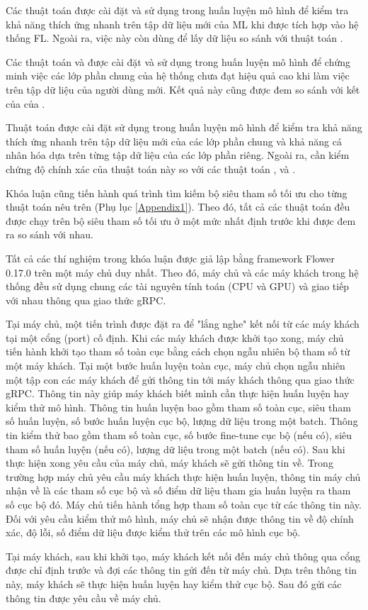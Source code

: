 Các thuật toán  được cài đặt và sử dụng trong huấn luyện mô hình để kiểm tra khả năng thích ứng nhanh trên tập dữ liệu mới của ML khi được tích hợp vào hệ thống FL. Ngoài ra, việc này còn dùng để lấy dữ liệu so sánh với thuật toán .

Các thuật toán  và  được cài đặt và sử dụng trong huấn luyện mô hình để chứng minh việc các lớp phần chung của hệ thống chưa đạt hiệu quả cao khi làm việc trên tập dữ liệu của người dùng mới. Kết quả này cũng được đem so sánh với kết của của .

Thuật toán  được cài đặt sử dụng trong huấn luyện mô hình để kiểm tra khả năng thích ứng nhanh trên tập dữ liệu mới của các lớp phần chung và khả năng cá nhân hóa dựa trên từng tập dữ liệu của các lớp phần riêng. Ngoài ra, cần kiểm chứng độ chính xác của thuật toán này so với các thuật toán ,  và .

Khóa luận cũng tiến hành quá trình tìm kiếm bộ siêu tham số tối ưu cho từng thuật toán nêu trên (Phụ lục \ref{Appendix1}). Theo đó, tất cả các thuật toán đều được chạy trên bộ siêu tham số tối ưu ở một mức nhất định trước khi được đem ra so sánh với nhau.

Tất cả các thí nghiệm trong khóa luận được giả lập bằng framework Flower 0.17.0 \cite{beutel2020flower} trên một máy chủ duy nhất. Theo đó, máy chủ và các máy khách trong hệ thống đều sử dụng chung các tài nguyên tính toán (CPU và GPU) và giao tiếp với nhau thông qua giao thức gRPC.

Tại máy chủ, một tiến trình được đặt ra để "lắng nghe" kết nối từ các máy khách tại một cổng (port) cố định. Khi các máy khách được khởi tạo xong, máy chủ tiến hành khởi tạo tham số toàn cục bằng cách chọn ngẫu nhiên bộ tham số từ một máy khách. Tại một bước huấn luyện toàn cục, máy chủ chọn ngẫu nhiên một tập con các máy khách để gửi thông tin tới máy khách thông qua giao thức gRPC. Thông tin này giúp máy khách biết mình cần thực hiện huấn luyện hay kiểm thử mô hình. Thông tin huấn luyện bao gồm tham số toàn cục, siêu tham số huấn luyện, số bước huấn luyện cục bộ, lượng dữ liệu trong một batch. Thông tin kiểm thử bao gồm tham số toàn cục, số bước fine-tune cục bộ (nếu có), siêu tham số huấn luyện (nếu có), lượng dữ liệu trong một batch (nếu có). Sau khi thực hiện xong yêu cầu của máy chủ, máy khách sẽ gửi thông tin về. Trong trường hợp máy chủ yêu cầu máy khách thực hiện huấn luyện, thông tin máy chủ nhận về là các tham số cục bộ và số điểm dữ liệu tham gia huấn luyện ra tham số cục bộ đó. Máy chủ tiến hành tổng hợp tham số toàn cục từ các thông tin này. Đối với yêu cầu kiểm thử mô hình, máy chủ sẽ nhận được thông tin về độ chính xác, độ lỗi, số điểm dữ liệu được kiểm thử trên các mô hình cục bộ.

Tại máy khách, sau khi khởi tạo, máy khách kết nối đến máy chủ thông qua cổng được chỉ định trước và đợi các thông tin gửi đến từ máy chủ. Dựa trên thông tin này, máy khách sẽ thực hiện huấn luyện hay kiểm thử cục bộ. Sau đó gửi các thông tin được yêu cầu về máy chủ.
